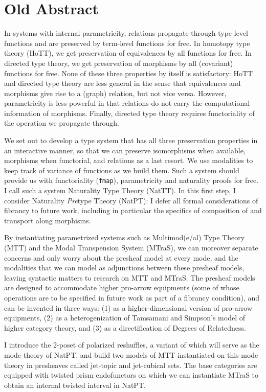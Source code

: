 \documentclass{lmcs} %
\theoremstyle{plain}\newtheorem{satz}[thm]{Satz} %
\theoremstyle{plain}
\theoremstyle{definition}
\begin{document}
\section{Old Abstract}
In systems with internal parametricity,
relations propagate through type-level functions and are preserved by term-level functions for free.
In homotopy type theory (HoTT), we get preservation of equivalences by all functions for free.
In directed type theory, we get preservation of morphisms by all (covariant) functions for free.
None of these three properties by itself is satisfactory:
HoTT and directed type theory are less general in the sense that equivalences and morphisms give rise to a (graph) relation, but not vice versa.
However, parametricity is less powerful in that relations do not carry the computational information of morphisms.
Finally, directed type theory requires functoriality of the operation we propagate through.

We set out to develop a type system that has all three preservation properties in an interactive manner, so that we can preserve isomorphisms when available, morphisms when functorial, and relations as a last resort.
We use modalities to keep track of variance of functions as we build them.
Such a system should provide us with functoriality (\texttt{fmap}), parametricity and naturality proofs for free. I call such a system Naturality Type Theory (NatTT).
In this first step, I consider Naturality \emph{Pre}type Theory (NatPT):
I defer all formal considerations of fibrancy to future work,
including in particular the specifics of composition of and transport along morphisms.

By instantiating parametrized systems such as Multimod(e/al) Type Theory (MTT) and the Modal Transpension System (MTraS), we can moreover separate concerns and only worry about the presheaf model at every mode, and the modalities that we can model as adjunctions between these presheaf models, leaving syntactic matters to research on MTT and MTraS.
The presheaf models are designed to accommodate higher pro-arrow equipments (some of whose operations are to be specified in future work as part of a fibrancy condition), and can be invented in three ways: (1) as a higher-dimensional version of pro-arrow equipments, (2) as a heterogenization of Tamsamani and Simpson's model of higher category theory, and (3) as a directification of Degrees of Relatedness.

I introduce the 2-poset of polarized reshuffles, a variant of which will serve as the mode theory of NatPT, and build two models of MTT instantiated on this mode theory in presheaves called jet-topic and jet-cubical sets.
The base categories are equipped with twisted prism endofunctors on which we can instantiate MTraS to obtain an internal twisted interval in NatPT.
\end{document}
